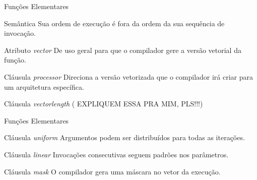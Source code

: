 \documentclass{beamer}
\begin{document}
\begin{frame}{Funções Elementares}
\begin{block}{Semântica}
    Sua ordem de execução é fora da ordem da sua sequência de invocação.
\end{block}
\begin{block}{Atributo \textit{vector}}
    De uso geral para que o compilador gere a versão vetorial da função.
\end{block}
\begin{block}{Cláusula \textit{processor}}
    Direciona a versão vetorizada que o compilador irá criar para um arquitetura específica.
\end{block}
\begin{block}{Cláusula \textit{vectorlength}}
    ( EXPLIQUEM ESSA PRA MIM, PLS!!!)
\end{block}
\end{frame}
\begin{frame}{Funções Elementares}
\begin{block}{Cláusula \textit{uniform}}
    Argumentos podem ser distribuídos para todas as iterações.
\end{block}
\begin{block}{Cláusula \textit{linear}}
    Invocações consecutivas seguem padrões nos parâmetros.
\end{block}
\begin{block}{Cláusula \textit{mask}}
    O compilador gera uma máscara no vetor da execução.
\end{block}
\end{frame}
\end{document}
